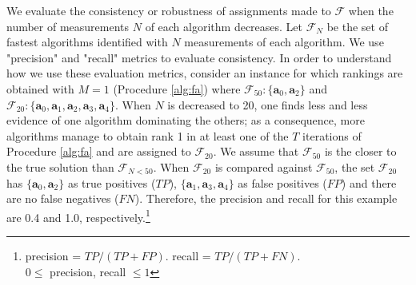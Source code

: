 \documentclass[conference]{IEEEtran}
\begin{document}
We evaluate the consistency or robustness of assignments made to $\mathcal{F}$ when the number of measurements $N$ of
each algorithm decreases. Let $\mathcal{F}_{N}$ be the set of fastest algorithms identified with $N$ measurements of
each algorithm. 
We use "precision" and "recall" metrics to evaluate consistency. 
In order to understand how we use these evaluation metrics, consider an instance for which rankings are obtained with $M=1$ (Procedure \ref{alg:fa})
where
$\mathcal{F}_{50}:\{\mathbf{a}_0,\mathbf{a}_2\}$ and
$\mathcal{F}_{20}:\{\mathbf{a}_0,\mathbf{a}_1,\mathbf{a}_2,\mathbf{a}_3,\mathbf{a}_4\}$.
When $N$ is decreased to 20, one finds less and less evidence of one
algorithm dominating the others; as a consequence, more algorithms manage to obtain rank 1 in at least one of the $T$
iterations of Procedure \ref{alg:fa} and are assigned to $\mathcal{F}_{20}$.  We assume that $\mathcal{F}_{50}$ is the
closer to the true solution than $\mathcal{F}_{N<50}$. When $\mathcal{F}_{20}$ is compared against $\mathcal{F}_{50}$,
the set $\mathcal{F}_{20}$ has  $\{\mathbf{a}_0,\mathbf{a}_2\}$ as true positives ($TP$),
$\{\mathbf{a}_1,\mathbf{a}_3,\mathbf{a}_4\}$  as false positives ($FP$) and there are no false negatives
($FN$). Therefore, the precision and recall for this example are 0.4 and 1.0, respectively.\footnote{precision =
  $TP/(TP+FP)$. recall = $TP/(TP+FN)$.\\ $0\le$ precision, recall $\le 1$}
\end{document}
